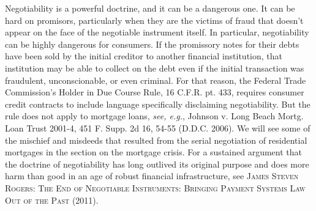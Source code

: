 Negotiability is a powerful doctrine, and it can be a dangerous one. It can be
hard on promisors, particularly when they are the victims of fraud that doesn't
appear on the face of the negotiable instrument itself. In particular,
negotiability can be highly dangerous for consumers. If the promissory notes
for their debts have been sold by the initial creditor to another financial
institution, that institution may be able to collect on the debt even if the
initial transaction was fraudulent, unconscionable, or even criminal. For that
reason, the Federal Trade Commission's Holder in Due Course Rule, 16 C.F.R. pt.
433, requires consumer credit contracts to include language specifically
disclaiming negotiability. But the rule does not apply to mortgage loans,
\textit{see, e.g.}, Johnson v. Long Beach Mortg. Loan Trust 2001-4, 451 F.
Supp. 2d 16, 54-55 (D.D.C. 2006). We will see some of the mischief and misdeeds
that resulted from the serial negotiation of residential mortgages in the
section on the mortgage crisis. For a sustained argument that the doctrine of
negotiability has long outlived its original purpose and does more harm than
good in an age of robust financial infrastructure, see
\textsc{James Steven Rogers: The End of Negotiable
Instruments: Bringing Payment Systems Law Out of the Past} (2011).

